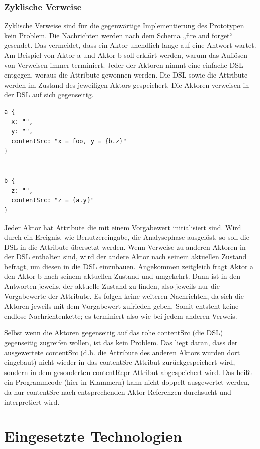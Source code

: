  
\subsubsection{Zyklische Verweise}\label{}

 
Zyklische Verweise sind für die gegenwärtige Implementierung des Prototypen kein Problem. Die Nachrichten werden nach dem Schema „fire and forget“ gesendet. Das vermeidet, dass ein Aktor unendlich lange auf eine Antwort wartet. Am Beispiel von Aktor a und Aktor b soll erklärt werden, warum das Auflösen von Verweisen immer terminiert. Jeder der Aktoren nimmt eine einfache DSL entgegen, woraus die Attribute gewonnen werden. Die DSL sowie die Attribute werden im Zustand des jeweiligen Aktors gespeichert. Die Aktoren verweisen in der DSL auf sich gegenseitig.

 
\begin{verbatim}
a {
  x: "",
  y: "",
  contentSrc: "x = foo, y = {b.z}"
}


b {
  z: "",
  contentSrc: "z = {a.y}"
}
\end{verbatim}
 
Jeder Aktor hat Attribute die mit einem Vorgabewert initialisiert sind. Wird durch ein Ereignis, wie Benutzereingabe, die Analysephase ausgelöst, so soll die DSL in die Attribute übersetzt werden. Wenn Verweise zu anderen Aktoren in der DSL enthalten sind, wird der andere Aktor nach seinem aktuellen Zustand befragt, um diesen in die DSL einzubauen. Angekommen zeitgleich fragt Aktor a den Aktor b nach seinem aktuellen Zustand und umgekehrt. Dann ist in den Antworten jeweils, der aktuelle Zustand zu finden, also jeweils nur die Vorgabewerte der Attribute. Es folgen keine weiteren Nachrichten, da sich die Aktoren jeweils mit dem Vorgabewert zufrieden geben. Somit entsteht keine endlose Nachrichtenkette; es terminiert also wie bei jedem anderen Verweis.

 
Selbst wenn die Aktoren gegenseitig auf das rohe contentSrc (die DSL) gegenseitig zugreifen wollen, ist das kein Problem. Das liegt daran, dass der ausgewertete contentSrc (d.h. die Attribute des anderen Aktors wurden dort eingebaut) nicht wieder in das contentSrc-Attribut zurückgespeichert wird, sondern in dem gesonderten contentRepr-Attribut abgespeichert wird. Das heißt ein Programmcode (hier in Klammern) kann nicht doppelt ausgewertet werden, da nur contentSrc nach entsprechenden Aktor-Referenzen durchsucht und interpretiert wird.

 
\section{Eingesetzte Technologien}\label{}
 
